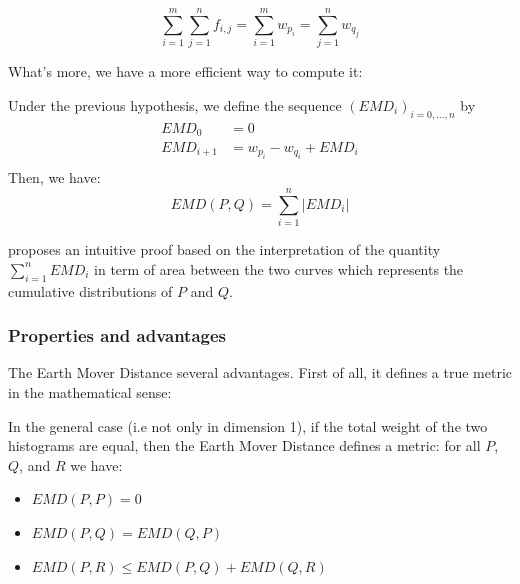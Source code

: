 \[
	 \sum_{i=1}^m \sum_{j=1}^n f_{i,j} = \sum_{i=1}^m w_{p_i} = \sum_{j=1}^n w_{q_j}
\]

What's more, we have a more efficient way to compute it:

\begin{theoreme}
	Under the previous hypothesis, we define the sequence $(EMD_i)_{i=0,\dots,n}$ by
\[
	\begin{aligned}
		EMD_0 &= 0\\
		EMD_{i+1} &= w_{p_i} - w_{q_i} + EMD_i\\
	\end{aligned}
\]
	Then, we have: 
\[
	EMD(P,Q) = \sum_{i=1}^n{ \left| EMD_i \right|}
\]
\end{theoreme}

\cite{EMD-proof} proposes an intuitive proof based on the interpretation of the quantity $\sum_{i=1}^n{EMD_i}$ in term of area between the two curves which represents the cumulative distributions of $P$ and $Q$.

\subsubsection{Properties and advantages}

The Earth Mover Distance several advantages. First of all, it defines a true metric in the mathematical sense:

\begin{theoreme}
	In the general case (i.e not only in dimension 1), if the total weight of the two histograms are equal, then the Earth Mover Distance defines a metric: for all $P$, $Q$, and $R$ we have:
	\begin{itemize}
		\item $EMD(P,P) = 0$
		\item $EMD(P,Q) = EMD(Q,P)$
		\item $EMD(P,R) \leq EMD(P,Q) + EMD(Q,R)$
	\end{itemize}
\end{theoreme}


